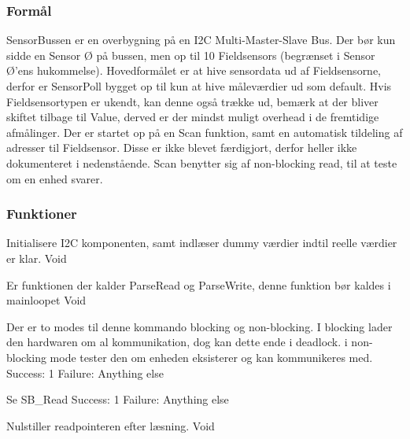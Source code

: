 \subsubsection{Formål}
SensorBussen er en overbygning på en I2C Multi-Master-Slave Bus. 
Der bør kun sidde en Sensor Ø på bussen, men op til 10 Fieldsensors 
(begrænset i Sensor Ø’ens hukommelse). Hovedformålet er at hive 
sensordata ud af Fieldsensorne, derfor er SensorPoll bygget op til 
kun at hive måleværdier ud som default. Hvis Fieldsensortypen er ukendt, 
kan denne også trække ud, bemærk at der bliver skiftet tilbage til Value, 
derved er der mindst muligt overhead i de fremtidige afmålinger. 
Der er startet op på en Scan funktion, samt en automatisk tildeling 
af adresser til Fieldsensor. Disse er ikke blevet færdigjort, derfor 
heller ikke dokumenteret i nedenstående. Scan benytter sig af 
non-blocking read, til at teste om en enhed svarer.


\subsubsection{Funktioner}

{Initialisere I2C komponenten, samt indlæser dummy værdier indtil reelle værdier er klar.}
{Void}
{}

{Er funktionen der kalder ParseRead og ParseWrite, denne funktion bør kaldes i mainloopet}
{Void}
{}

{Der er to modes til denne kommando blocking og 
non-blocking. I blocking lader den hardwaren om al 
kommunikation, dog kan dette ende i deadlock. 
i non-blocking mode tester den om enheden eksisterer 
og kan kommunikeres med.}
{Success: 1 Failure: Anything else}
{
}

{Se SB\_Read}
{Success: 1 Failure: Anything else}
{
}

{Nulstiller readpointeren efter læsning.}
{Void}
{}

